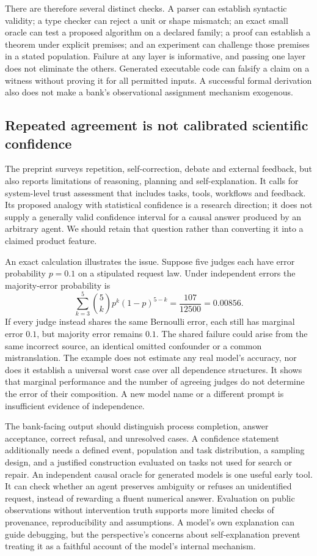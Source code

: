 There are therefore several distinct checks. A parser can establish syntactic
validity; a type checker can reject a unit or shape mismatch; an exact small oracle
can test a proposed algorithm on a declared family; a proof can establish a theorem
under explicit premises; and an experiment can challenge those premises in a stated
population. Failure at any layer is informative, and passing one layer does not
eliminate the others. Generated executable code can falsify a claim on a witness
without proving it for all permitted inputs. A successful formal derivation also
does not make a bank's observational assignment mechanism exogenous.

\subsection{Repeated agreement is not calibrated scientific confidence}

The preprint surveys repetition, self-correction, debate and external feedback, but
also reports limitations of reasoning, planning and self-explanation. It calls for
system-level trust assessment that includes tasks, tools, workflows and feedback.
Its proposed analogy with statistical confidence is a research direction; it does
not supply a generally valid confidence interval for a causal answer produced by
an arbitrary agent. We should retain that question rather than converting it into
a claimed product feature.~\citep{exec24_scimethod_original}

An exact calculation illustrates the issue. Suppose five judges each have error
probability $p=0.1$ on a stipulated request law. Under independent errors the
majority-error probability is
\[
 \sum_{k=3}^{5}\binom{5}{k}p^k(1-p)^{5-k}
 =\frac{107}{12500}=0.00856.
\]
If every judge instead shares the same Bernoulli error, each still has marginal
error $0.1$, but majority error remains $0.1$. The shared failure could arise from
the same incorrect source, an identical omitted confounder or a common mistranslation.
The example does not estimate any real model's accuracy, nor does it establish a
universal worst case over all dependence structures. It shows that marginal
performance and the number of agreeing judges do not determine the error of their
composition. A new model name or a different prompt is insufficient evidence of
independence.~\citep{exec24_scimethod_reference}

The bank-facing output should distinguish process completion, answer acceptance,
correct refusal, and unresolved cases. A confidence statement additionally needs
a defined event, population and task distribution, a sampling design, and a
justified construction evaluated on tasks not used for search or repair. An
independent causal oracle for generated models is one useful early tool. It can
check whether an agent preserves ambiguity or refuses an unidentified request,
instead of rewarding a fluent numerical answer. Evaluation on public observations
without intervention truth supports more limited checks of provenance,
reproducibility and assumptions. A model's own explanation can guide debugging,
but the perspective's concerns about self-explanation prevent treating it as a
faithful account of the model's internal mechanism.

